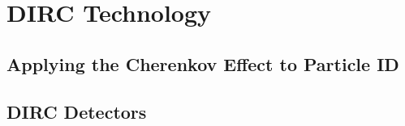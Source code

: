 \chapter{DIRC Technology}

\section{Applying the Cherenkov Effect to Particle ID}
\section{DIRC Detectors}
